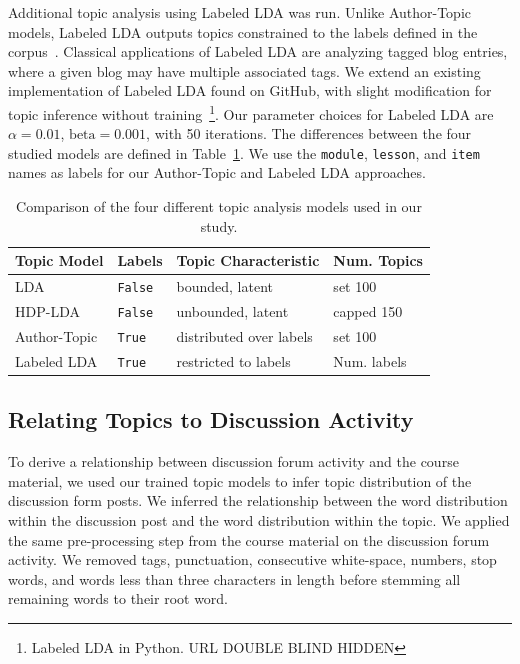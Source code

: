 \documentclass[sigconf, anonymous]{acmart}
\begin{document}
Additional topic analysis using Labeled LDA was run.
Unlike Author-Topic models, Labeled LDA outputs topics constrained to the labels defined in the corpus~\cite{ramage2009labeled}.
Classical applications of Labeled LDA are analyzing tagged blog entries, where a given blog may have multiple associated tags.
We extend an existing implementation of Labeled LDA found on GitHub, with slight modification for topic inference without training~\footnote{Labeled LDA in Python.
    URL DOUBLE BLIND HIDDEN}.
Our parameter choices for Labeled LDA are $\alpha=0.01$, $\text{beta}=0.001$, with 50 iterations.
The differences between the four studied models are defined in Table~\ref{tab:topic_models}. We use the \texttt{module}, \texttt{lesson}, and \texttt{item} names as labels for our Author-Topic and Labeled LDA approaches.

\begin{table}
    \centering
    \begin{tabularx}{\columnwidth}{@{}llll@{}}
    \toprule
    Topic Model & Labels & Topic Characteristic & Num. Topics \\
    \midrule
    LDA & \texttt{False} & bounded, latent & set 100 \\
    HDP-LDA & \texttt{False} & unbounded, latent  & capped 150 \\
    Author-Topic & \texttt{True} & distributed over labels & set 100 \\
    Labeled LDA & \texttt{True} & restricted to labels & Num. labels \\
    \bottomrule
    \end{tabularx}
    \caption{Comparison of the four different topic analysis models used in our study.}
    \label{tab:topic_models}
\end{table}

\subsection{Relating Topics to Discussion Activity}
To derive a relationship between discussion forum activity and the course material, we used our trained topic models to infer topic distribution of the discussion form posts.
We inferred the relationship between the word distribution within the discussion post and the word distribution within the topic.
We applied the same pre-processing step from the course material on the discussion forum activity. We removed tags, punctuation, consecutive white-space, numbers, stop words, and words less than three characters in length before stemming all remaining words to their root word.
\end{document}
